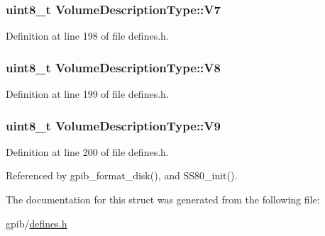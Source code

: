 \subsubsection[{\texorpdfstring{V7}{V7}}]{\setlength{\rightskip}{0pt plus 5cm}uint8\+\_\+t Volume\+Description\+Type\+::\+V7}\hypertarget{structVolumeDescriptionType_a5d057bc3e9f6537234dfb904c740c68f}{}\label{structVolumeDescriptionType_a5d057bc3e9f6537234dfb904c740c68f}


Definition at line 198 of file defines.\+h.

\subsubsection[{\texorpdfstring{V8}{V8}}]{\setlength{\rightskip}{0pt plus 5cm}uint8\+\_\+t Volume\+Description\+Type\+::\+V8}\hypertarget{structVolumeDescriptionType_a86597a2edf96558d4176afc6ac3a0565}{}\label{structVolumeDescriptionType_a86597a2edf96558d4176afc6ac3a0565}


Definition at line 199 of file defines.\+h.

\subsubsection[{\texorpdfstring{V9}{V9}}]{\setlength{\rightskip}{0pt plus 5cm}uint8\+\_\+t Volume\+Description\+Type\+::\+V9}\hypertarget{structVolumeDescriptionType_a8db8489c65036975ec2ebe01734310be}{}\label{structVolumeDescriptionType_a8db8489c65036975ec2ebe01734310be}


Definition at line 200 of file defines.\+h.



Referenced by gpib\+\_\+format\+\_\+disk(), and S\+S80\+\_\+init().



The documentation for this struct was generated from the following file\+:\begin{DoxyCompactItemize}
\item 
gpib/\hyperlink{defines_8h}{defines.\+h}\end{DoxyCompactItemize}
